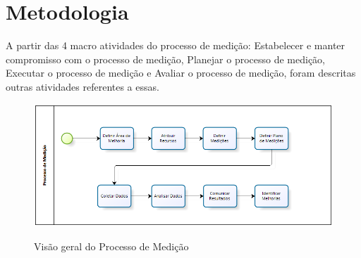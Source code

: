 \chapter{Metodologia}

A partir das 4 macro atividades do processo de medição: Estabelecer e manter compromisso com o processo de medição, Planejar o processo de medição, Executar o processo de medição e Avaliar o processo de medição, foram descritas outras atividades referentes a essas.

\begin{figure}[!htp]
		\centering
		\includegraphics[scale=0.55]{figuras/medicao}
		\label{img:processo}
		\caption{Visão geral do Processo de Medição}
\end{figure}
